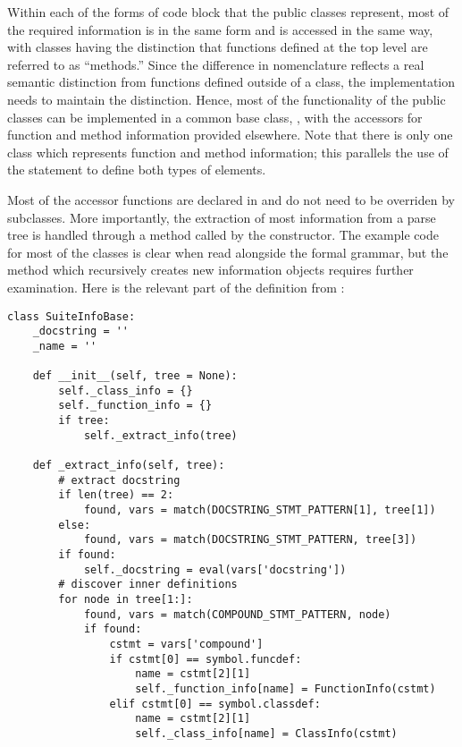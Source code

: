 Within each of the forms of code block that the public classes
represent, most of the required information is in the same form and is
accessed in the same way, with classes having the distinction that
functions defined at the top level are referred to as ``methods.''
Since the difference in nomenclature reflects a real semantic
distinction from functions defined outside of a class, the
implementation needs to maintain the distinction.
Hence, most of the functionality of the public classes can be
implemented in a common base class, , with the
accessors for function and method information provided elsewhere.
Note that there is only one class which represents function and method
information; this parallels the use of the  statement to
define both types of elements.

Most of the accessor functions are declared in 
and do not need to be overriden by subclasses.  More importantly, the
extraction of most information from a parse tree is handled through a
method called by the  constructor.  The example
code for most of the classes is clear when read alongside the formal
grammar, but the method which recursively creates new information
objects requires further examination.  Here is the relevant part of
the  definition from :

\begin{verbatim}
class SuiteInfoBase:
    _docstring = ''
    _name = ''

    def __init__(self, tree = None):
        self._class_info = {}
        self._function_info = {}
        if tree:
            self._extract_info(tree)

    def _extract_info(self, tree):
        # extract docstring
        if len(tree) == 2:
            found, vars = match(DOCSTRING_STMT_PATTERN[1], tree[1])
        else:
            found, vars = match(DOCSTRING_STMT_PATTERN, tree[3])
        if found:
            self._docstring = eval(vars['docstring'])
        # discover inner definitions
        for node in tree[1:]:
            found, vars = match(COMPOUND_STMT_PATTERN, node)
            if found:
                cstmt = vars['compound']
                if cstmt[0] == symbol.funcdef:
                    name = cstmt[2][1]
                    self._function_info[name] = FunctionInfo(cstmt)
                elif cstmt[0] == symbol.classdef:
                    name = cstmt[2][1]
                    self._class_info[name] = ClassInfo(cstmt)
\end{verbatim}

